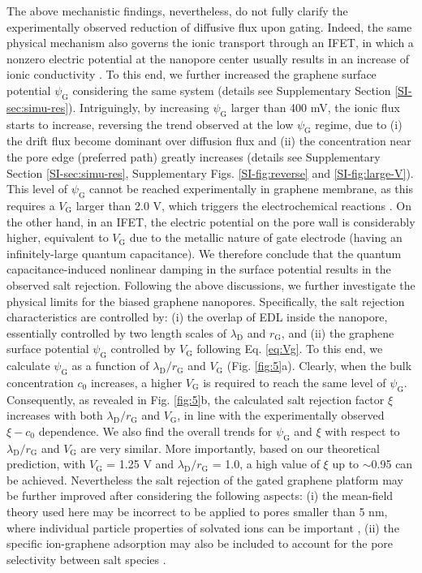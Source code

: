 \documentclass[journal=langd5,email=true, hyperref=true, keywords=false]{achemso}
\newcommand{\Fig}{Fig.}
\begin{document}
The above mechanistic findings, nevertheless, do not fully clarify the
experimentally observed reduction of diffusive flux upon
gating. Indeed, the same physical mechanism also governs the ionic
transport through an IFET, in which a nonzero electric potential at
the nanopore center usually results in an increase of ionic
conductivity \cite{Nam_2009,Lee_2015,Feng_2016}. To this end, we
further increased the graphene surface potential $\psi_{\mathrm{G}}$
considering the same system (details see Supplementary Section
\ref{SI-sec:simu-res}). Intriguingly, by increasing
$\psi_{\mathrm{G}}$ larger than 400 mV, the ionic flux starts to
increase, reversing the trend observed at the low $\psi_{\mathrm{G}}$
regime, due to (i) the drift flux become dominant over diffusion flux
and (ii) the concentration near the pore edge (preferred path) greatly
increases (details see Supplementary Section \ref{SI-sec:simu-res},
Supplementary Figs. \ref{SI-fig:reverse} and
\ref{SI-fig:large-V}). This level of $\psi_{\mathrm{G}}$ cannot be
reached experimentally in graphene membrane, as this requires a
$V_{\mathrm{G}}$ larger than 2.0 V, which triggers the electrochemical
reactions \cite{Toh_2011}. On the other hand, in an IFET, the electric
potential on the pore wall is considerably higher, equivalent to
$V_{\mathrm{G}}$ due to the metallic nature of gate electrode (having
an infinitely-large quantum capacitance). We therefore conclude that
the quantum capacitance-induced nonlinear damping in the surface
potential results in the observed salt rejection.  Following the above
discussions, we further investigate the physical limits for the biased
graphene nanopores. Specifically, the salt rejection characteristics
are controlled by: (i) the overlap of EDL inside the nanopore,
essentially controlled by two length scales of $\lambda_{\mathrm{D}}$
and $r_{\mathrm{G}}$, and (ii) the graphene surface potential
$\psi_{\mathrm{G}}$ controlled by $V_{\mathrm{G}}$ following
Eq. \eqref{eq:Vg}. To this end, we calculate $\psi_{\mathrm{G}}$ as a
function of $\lambda_{\mathrm{D}} / r_{\mathrm{G}}$ and
$V_{\mathrm{G}}$ (\Fig{} \ref{fig:5}a). Clearly, when the bulk
concentration $c_{0}$ increases, a higher $V_{\mathrm{G}}$ is required
to reach the same level of $\psi_{\mathrm{G}}$. Consequently, as
revealed in \Fig{} \ref{fig:5}b, the calculated salt rejection factor
$\xi$ increases with both $\lambda_{\mathrm{D}} / r_{\mathrm{G}}$ and
$V_{\mathrm{G}}$, in line with the experimentally observed
$\xi - c_{0}$ dependence. We also find the overall trends for
$\psi_{\mathrm{G}}$ and $\xi$ with respect to
$\lambda_{\mathrm{D}}/r_{\mathrm{G}}$ and $V_{\mathrm{G}}$ are very
similar. More importantly, based on our theoretical prediction, with
$V_{\mathrm{G}}$ = 1.25 V and $\lambda_{\mathrm{D}} / r_{\mathrm{G}}$
= 1.0, a high value of $\xi$ up to $\sim$0.95 can be achieved. Nevertheless
the salt rejection of the gated graphene platform may be further
improved after considering the following aspects: (i) the mean-field
theory used here may be incorrect to be applied to pores smaller than
5 nm, where individual particle properties of solvated ions can be
important \cite{Jain_2015}, (ii) the specific ion-graphene adsorption
may also be included to account for the pore selectivity between salt
species \cite{Rollings_2016}.
\end{document}
